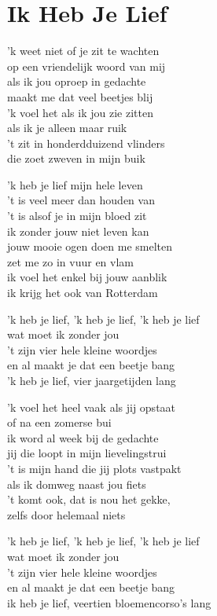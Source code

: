 \section{Ik Heb Je Lief}

'k weet niet of je zit te wachten\\
op een vriendelijk woord van mij\\
als ik jou oproep in gedachte\\
maakt me dat veel beetjes blij\\
'k voel het als ik jou zie zitten\\
als ik je alleen maar ruik\\
't zit in honderdduizend vlinders\\
die zoet zweven in mijn buik

'k heb je lief mijn hele leven\\
't is veel meer dan houden van\\
't is alsof je in mijn bloed zit\\
ik zonder jouw niet leven kan\\
jouw mooie ogen doen me smelten\\
zet me zo in vuur en vlam\\
ik voel het enkel bij jouw aanblik\\
ik krijg het ook van Rotterdam

'k heb je lief, 'k heb je lief, 'k heb je lief\\
wat moet ik zonder jou\\
't zijn vier hele kleine woordjes\\
en al maakt je dat een beetje bang\\
'k heb je lief, vier jaargetijden lang

'k voel het heel vaak als jij opstaat\\
of na een zomerse bui\\
ik word al week bij de gedachte\\
jij die loopt in mijn lievelingstrui\\
't is mijn hand die jij plots vastpakt\\
als ik domweg naast jou fiets\\
't komt ook, dat is nou het gekke,\\
zelfs door helemaal niets

'k heb je lief, 'k heb je lief, 'k heb je lief\\
wat moet ik zonder jou\\
't zijn vier hele kleine woordjes\\
en al maakt je dat een beetje bang\\
ik heb je lief, veertien bloemencorso's lang

